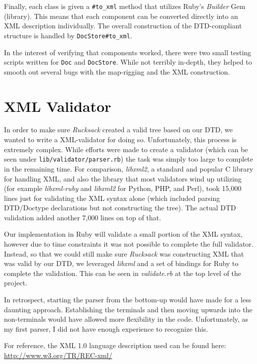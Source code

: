 \documentclass[letterpaper,11pt,twoside]{article}
\begin{document}
Finally, each class is given a \texttt{\#to\_xml} method that utilizes Ruby's \emph{Builder} Gem (library). This means that each component can be converted directly into an XML description individually. The overall construction of the DTD-compliant structure is handled by \texttt{DocStore\#to\_xml}.

In the interest of verifying that components worked, there were two small testing scripts written for \texttt{Doc} and \texttt{DocStore}. While not terribly in-depth, they helped to smooth out several bugs with the map-rigging and the XML construction.

\section{XML Validator}
In order to make sure \emph{Rucksack} created a valid tree based on our DTD, we wanted to write a XML-validator for doing so. Unfortunately, this process is extremely complex. While efforts were made to create a validator (which can be seen under \texttt{lib/validator/parser.rb}) the task was simply too large to complete in the remaining time. For comparison, \emph{libxml2}, a standard and popular C library for handling XML, and also the library that most validators wind up utilizing (for example \emph{libxml-ruby} and \emph{libxml2} for Python, PHP, and Perl), took 15,000 lines just for validating the XML syntax alone (which included parsing DTD/Doctype declarations but not constructing the tree). The actual DTD validation added another 7,000 lines on top of that.

Our implementation in Ruby will validate a small portion of the XML syntax, however due to time constraints it was not possible to complete the full validator. Instead, so that we could still make sure \emph{Rucksack} was constructing XML that was valid by our DTD, we leveraged \emph{libxml} and a set of bindings for Ruby to complete the validation. This can be seen in \emph{validate.rb} at the top level of the project.

In retrospect, starting the parser from the bottom-up would have made for a less daunting approach. Establishing the terminals and then moving upwards into the non-terminals would have allowed more flexibility in the code. Unfortunately, as my first parser, I did not have enough experience to recognize this.

For reference, the XML 1.0 language description used can be found here: \url{http://www.w3.org/TR/REC-xml/}
\end{document}
